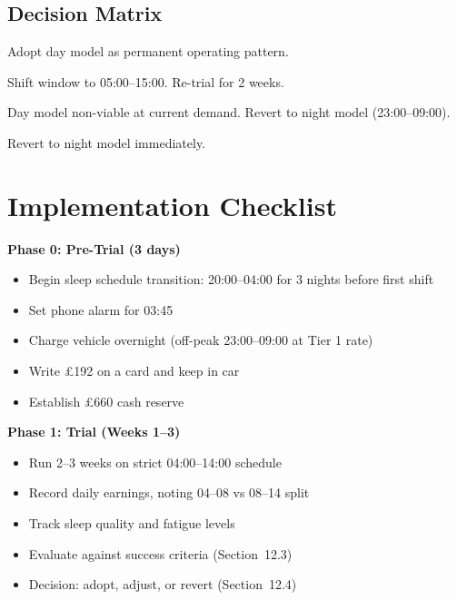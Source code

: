\documentclass[a4paper,11pt]{article}
\begin{document}
\subsection{Decision Matrix}

\begin{description}[leftmargin=2em, style=nextline]
\item[\textbf{All criteria pass:}] Adopt day model as permanent operating pattern.
\item[\textbf{Earnings pass, sleep fails:}] Shift window to 05:00--15:00. Re-trial for 2 weeks.
\item[\textbf{Earnings fail, sleep passes:}] Day model non-viable at current demand. Revert to night model (23:00--09:00).
\item[\textbf{All criteria fail:}] Revert to night model immediately.
\end{description}

\newpage

\section{Implementation Checklist}

\textbf{Phase 0: Pre-Trial (3 days)}

\begin{itemize}[label=$\square$, leftmargin=2em]
\item Begin sleep schedule transition: 20:00--04:00 for 3 nights before first shift
\item Set phone alarm for 03:45
\item Charge vehicle overnight (off-peak 23:00--09:00 at Tier 1 rate)
\item Write \pounds192 on a card and keep in car
\item Establish \pounds660 cash reserve
\end{itemize}

\textbf{Phase 1: Trial (Weeks 1--3)}

\begin{itemize}[label=$\square$, leftmargin=2em]
\item Run 2--3 weeks on strict 04:00--14:00 schedule
\item Record daily earnings, noting 04--08 vs 08--14 split
\item Track sleep quality and fatigue levels
\item Evaluate against success criteria (Section~12.3)
\item Decision: adopt, adjust, or revert (Section~12.4)
\end{itemize}
\end{document}
